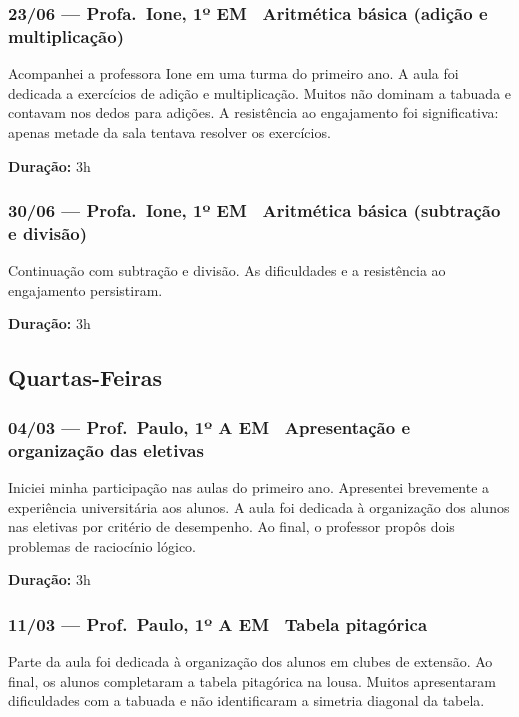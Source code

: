 \documentclass[11pt]{article}
\begin{document}
\subsubsection*{23/06 --- Profa.\ Ione, 1º EM \textbar\ Aritmética básica (adição e multiplicação)}

Acompanhei a professora Ione em uma turma do primeiro ano. A aula foi dedicada a exercícios de adição e multiplicação. Muitos não dominam a tabuada e contavam nos dedos para adições. A resistência ao engajamento foi significativa: apenas metade da sala tentava resolver os exercícios.

\textbf{Duração:} 3h

\subsubsection*{30/06 --- Profa.\ Ione, 1º EM \textbar\ Aritmética básica (subtração e divisão)}

Continuação com subtração e divisão. As dificuldades e a resistência ao engajamento persistiram.

\textbf{Duração:} 3h

\subsection*{Quartas-Feiras}

\subsubsection*{04/03 --- Prof.\ Paulo, 1º A EM \textbar\ Apresentação e organização das eletivas}

Iniciei minha participação nas aulas do primeiro ano. Apresentei brevemente a experiência universitária aos alunos. A aula foi dedicada à organização dos alunos nas eletivas por critério de desempenho. Ao final, o professor propôs dois problemas de raciocínio lógico.

\textbf{Duração:} 3h

\subsubsection*{11/03 --- Prof.\ Paulo, 1º A EM \textbar\ Tabela pitagórica}

Parte da aula foi dedicada à organização dos alunos em clubes de extensão. Ao final, os alunos completaram a tabela pitagórica na lousa. Muitos apresentaram dificuldades com a tabuada e não identificaram a simetria diagonal da tabela.
\end{document}
